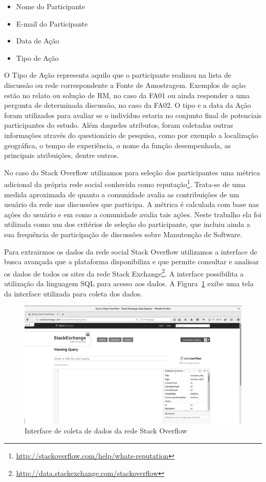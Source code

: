 \begin{itemize}
	\item Nome do Participante
	\item E-mail do Participante
	\item Data de Ação
	\item Tipo de Ação
\end{itemize}

O Tipo de Ação representa aquilo que o participante realizou na lista de
discussão ou rede correspondente a Fonte de Amostragem. Exemplos de ação estão no
relato ou solução de RM, no caso da FA01 ou ainda responder a uma pergunta de
determinada discussão, no caso da FA02. O tipo e a data da Ação foram utilizados
para avaliar se o indivíduo estaria no conjunto final de potenciais
participantes do estudo. Além daqueles atributos, foram coletadas outras
informações através do questionário de pesquisa, como por exemplo a localização
geográfica, o tempo de experiência, o nome da função desempenhada, as principais
atribuições, dentre outros.

No caso do Stack Overflow utilizamos para seleção dos participantes uma métrica
adicional da própria rede social conhecida como
reputação\footnote{\url{http://stackoverflow.com/help/whats-reputation}}.
Trata-se de uma medida aproximada de quanto a comunidade avalia as contribuições
de um usuário da rede nas discussões que participa. A métrica é calculada com
base nas ações do usuário e em como a comunidade avalia tais ações. Neste
trabalho ela foi utilizada como um dos critérios de seleção do participante, que
incluiu ainda a sua frequência de participação de discussões sobre Manutenção de
Software.

Para extrairmos os dados da rede social Stack Overflow utilizamos a interface de
busca avançada que a plataforma disponibiliza e que permite consultar e analisar
os dados de todos os sites da rede Stack
Exchange\footnote{\url{http://data.stackexchange.com/stackoverflow}}. A
interface possibilita a utilização da linguagem SQL para acesso aos dados. A
Figura~\ref{fig:stack-exchange} exibe uma tela da interface utilizada para
coleta dos dados.

\begin{figure}[htpb]
	\centering
	\includegraphics[width=0.9\linewidth]{./chapter-pesquisa-com-profissionais/img/stack-exchange.png}
	\caption{Interface de coleta de dados da rede Stack Overflow}
\label{fig:stack-exchange}
\end{figure}

